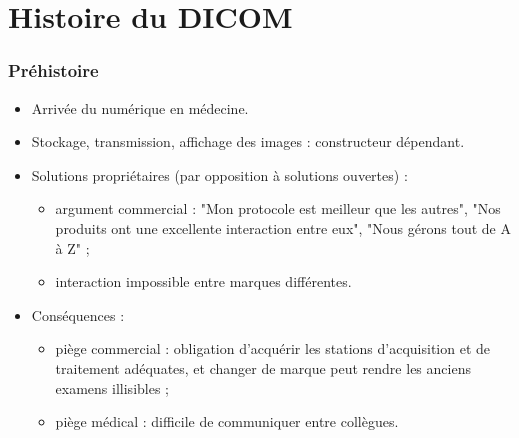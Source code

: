 \section{Histoire du DICOM}

	\frame
	{
		\frametitle{Pr\'ehistoire}
		
		\begin{itemize}
			\item<1-> Arriv\'ee du num\'erique en m\'edecine.
			\item<2-> Stockage, transmission, affichage des images : constructeur d\'ependant.
			\item<3-> Solutions propri\'etaires (par opposition \`a solutions ouvertes) :
			\begin{itemize}
				\item<4-> argument commercial : "Mon protocole est meilleur que les autres", "Nos produits ont une excellente interaction entre eux", "Nous g\'erons tout de A \`a Z" ;
				\item<5-> interaction impossible entre marques diff\'erentes.
			\end{itemize} 
			\item<6-> Cons\'equences :
			\begin{itemize}
				\item<7-> pi\`ege commercial : obligation d'acqu\'erir les stations d'acquisition et de traitement ad\'equates, et changer de marque peut rendre les anciens examens illisibles ;
				\item<8-> pi\`ege m\'edical : difficile de communiquer entre coll\`egues.
			\end{itemize}
		\end{itemize}
	}
					
